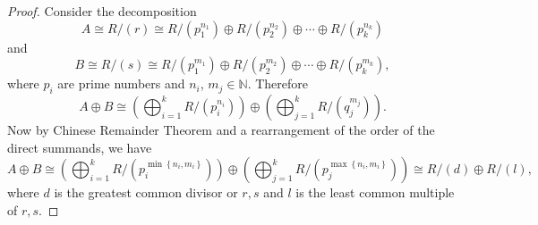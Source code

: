 \begin{proof}
Consider the decomposition 
$$
A\cong R/\left( r \right) \cong R/\left( p_{1}^{n_1} \right) \oplus R/\left( p_{2}^{n_2} \right) \oplus \cdots \oplus R/\left( p_{k}^{n_k} \right) 
$$
and 
$$
B\cong R/\left( s \right) \cong R/\left( p_{1}^{m_1} \right) \oplus R/\left( p_{2}^{m_2} \right) \oplus \cdots \oplus R/\left( p_{k}^{m_k} \right) ,
$$
where $p_i$ are prime numbers and $n_i$, $m_j\in\mathbb{N}$. Therefore 
$$
A\oplus B\cong \left( \bigoplus_{i=1}^k{R/\left( p_{i}^{n_i} \right)} \right) \oplus \left( \bigoplus_{j=1}^k{R/\left( q_{j}^{m_j} \right)} \right) .
$$
Now by Chinese Remainder Theorem and a rearrangement of the order of the direct summands, we have 
$$
A\oplus B\cong \left( \bigoplus_{i=1}^k{R/\left( p_{i}^{\min \left\{ n_i,m_i \right\}} \right)} \right) \oplus \left( \bigoplus_{j=1}^k{R/\left( p_{j}^{\max \left\{ n_i,m_i \right\}} \right)} \right) \cong R/\left( d \right) \oplus R/\left( l \right) ,
$$
where $d$ is the greatest common divisor or $r,s$ and $l$ is the least common multiple of $r,s$.
\end{proof}
